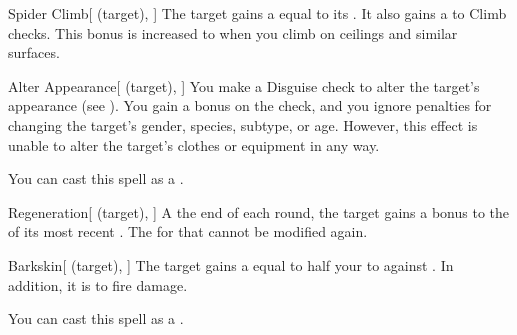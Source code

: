 \lowercase{\hypertarget{spell:Spider Climb}{}}\label{spell:Spider Climb}
\begin{attuneability}[\nth{1}]{\hypertarget{spell:Spider Climb}{Spider Climb}}[ (target), ]
The target gains a  equal to its .
It also gains a   to Climb checks.
This bonus is increased to  when you climb on ceilings and similar surfaces.
\end{attuneability}
\vspace{0.25em}



\lowercase{\hypertarget{spell:Alter Appearance}{}}\label{spell:Alter Appearance}
\begin{attuneability}[\nth{2}]{\hypertarget{spell:Alter Appearance}{Alter Appearance}}[ (target), ]
You make a Disguise check to alter the target's appearance (see ).
You gain a  bonus on the check, and you ignore penalties for changing the target's gender, species, subtype, or age.
However, this effect is unable to alter the target's clothes or equipment in any way.

You can cast this spell as a .
\end{attuneability}
\vspace{0.25em}



\lowercase{\hypertarget{spell:Regeneration}{}}\label{spell:Regeneration}
\begin{attuneability}[\nth{2}]{\hypertarget{spell:Regeneration}{Regeneration}}[ (target), ]
A the end of each round, the target gains a  bonus to the  of its most recent .
The  for that  cannot be modified again.
\end{attuneability}
\vspace{0.25em}



\lowercase{\hypertarget{spell:Barkskin}{}}\label{spell:Barkskin}
\begin{attuneability}[\nth{3}]{\hypertarget{spell:Barkskin}{Barkskin}}[ (target), ]
The target gains a  equal to half your  to  against .
In addition, it is  to fire damage.

You can cast this spell as a .
\end{attuneability}
\vspace{0.25em}



